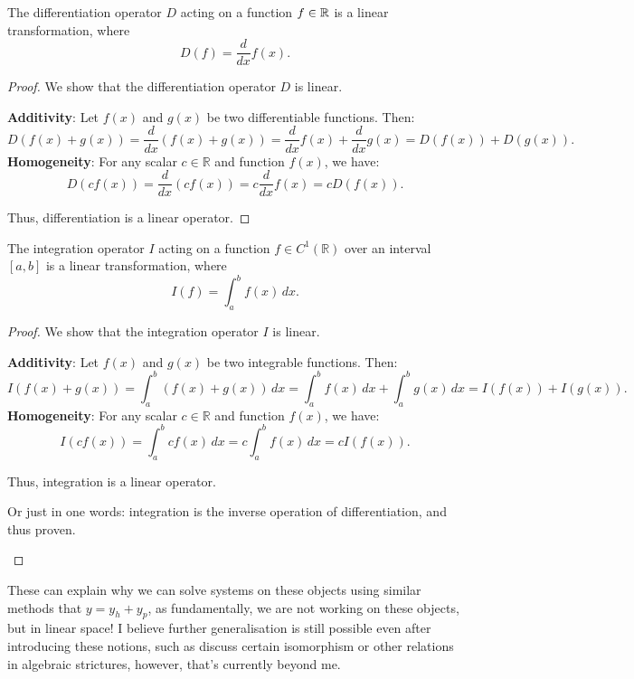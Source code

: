 \documentclass[12pt,a4paper]{article}
\begin{document}
\begin{proposition}
The differentiation operator \( D \) acting on a function \( f \in \mathbb{R} \) is a linear transformation, where
\[
D(f) = \frac{d}{dx} f(x).
\]
\end{proposition}

\begin{proof}
We show that the differentiation operator \( D \) is linear.

\textbf{Additivity}: Let \(f(x)\) and \(g(x)\) be two differentiable functions. Then:
\[
D(f(x) + g(x)) = \frac{d}{dx} (f(x) + g(x)) = \frac{d}{dx} f(x) + \frac{d}{dx} g(x) = D(f(x)) + D(g(x)).
\]
\textbf{Homogeneity}: For any scalar \(c \in \mathbb{R}\) and function \(f(x)\), we have:
\[
D(c f(x)) = \frac{d}{dx} (c f(x)) = c \frac{d}{dx} f(x) = c D(f(x)).
\]

Thus, differentiation is a linear operator.
\end{proof}

\begin{proposition}
The integration operator \( I \) acting on a function \( f \in C^1(\mathbb{R}) \) over an interval \([a, b]\) is a linear transformation, where
\[
I(f) = \int_a^b f(x) \, dx.
\]
\end{proposition}

\begin{proof}
We show that the integration operator \( I \) is linear.

\textbf{Additivity}: Let \(f(x)\) and \(g(x)\) be two integrable functions. Then:
\[
I(f(x) + g(x)) = \int_a^b (f(x) + g(x)) \, dx = \int_a^b f(x) \, dx + \int_a^b g(x) \, dx = I(f(x)) + I(g(x)).
\]
\textbf{Homogeneity}: For any scalar \(c \in \mathbb{R}\) and function \(f(x)\), we have:
\[
I(c f(x)) = \int_a^b c f(x) \, dx = c \int_a^b f(x) \, dx = c I(f(x)).
\]

Thus, integration is a linear operator.

\begin{remark}
    Or just in one words: integration is the inverse operation of differentiation, and thus proven.
\end{remark}
\end{proof}

These can explain why we can solve systems on these objects using similar methods that $y = y_h+y_p$, as fundamentally, we are not working on these objects, but in linear space! I believe further generalisation is still possible even after introducing these notions, such as discuss certain isomorphism or other relations in algebraic strictures, however, that's currently beyond me.
\end{document}
